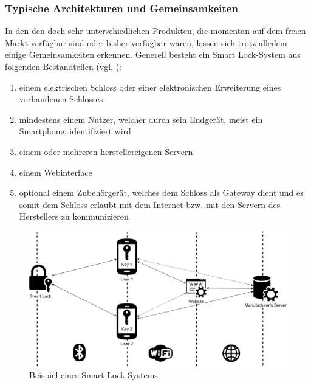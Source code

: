 	\subsubsection{Typische Architekturen und Gemeinsamkeiten}
	\label{sec:sota_smart_locks_arch}
	    In den den doch sehr unterschiedlichen Produkten, die momentan auf dem freien Markt verfügbar sind oder bisher verfügbar waren, lassen sich trotz alledem einige Gemeinsamkeiten erkennen\cite{Ye2017,Fuller2017}. 
    	\noindent Generell besteht ein Smart Lock-System aus folgenden Bestandteilen (vgl. ):
    	\begin{enumerate}[noitemsep]
    		\item einem elektrischen Schloss oder einer elektronischen Erweiterung eines vorhandenen Schlosses
    		\item mindestens einem Nutzer, welcher durch sein Endgerät, meist ein Smartphone, identifiziert wird
    		\item einem oder mehreren herstellereigenen Servern
    		\item einem Webinterface
    		\item optional einem Zubehörgerät, welches dem Schloss als Gateway dient und es somit dem Schloss erlaubt mit dem Internet bzw. mit den Servern des Herstellers zu kommunizieren
    	\end{enumerate}
    
    	\begin{figure}[H]
			\centering
			\includegraphics[width=\textwidth]{graphics/sl_arch.png}
			\caption{Beispiel eines Smart Lock-Systems}
			\label{fig:sl_arch}
		\end{figure}
    	
